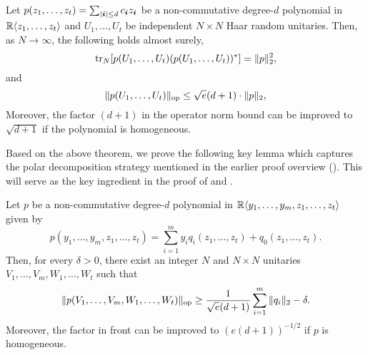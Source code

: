 \begin{theorem} \label{thm:op-norm}
    Let $p(z_1, \ldots, z_t) = \sum_{|{\boldsymbol{i}}|\le d} c_{{\boldsymbol{i}}}z_{{\boldsymbol{i}}} $ be a non-commutative degree-$d$ polynomial in ${\mathbb R}\langle z_1, \ldots, z_t\rangle$ and $U_1, \ldots, U_t$ be independent $N \times N$ Haar random unitaries. Then, as $N \to \infty$, the following holds almost surely, 
    \[ \mathrm{tr}_N[p(U_1, \ldots, U_t) (p(U_1, \ldots, U_t))^*] =  \|p\|_2^2,\]
    and
    \[ \|p(U_1, \ldots, U_t)\|_{\mathrm{op}} \le \sqrt{e}(d+1)  \cdot \|p\|_2,\]
    Moreover, the factor $(d+1)$ in the operator norm bound can be improved to $\sqrt{d+1}$ if the polynomial is homogeneous.
\end{theorem}

Based on the above theorem, we prove the following key lemma which captures the polar decomposition strategy mentioned in the earlier proof overview (). This will serve as the key ingredient in the proof of  and . 

\begin{lemma}\label{lem:polar}
    Let $p$ be a non-commutative degree-$d$ polynomial in ${\mathbb R}\langle y_1, \ldots, y_m, z_1, \ldots, z_t\rangle$ given by
    \[ p(y_1, \ldots, y_m, z_1, \ldots, z_t) = \sum_{i=1}^m y_i q_i(z_1, \ldots, z_t) + q_0(z_1, \ldots, z_t).\]
    Then, for every $\delta > 0$, there exist an integer $N$ and $N \times N$ unitaries $V_1,\ldots, V_m, W_1, \ldots, W_t$ such that 
    \[ \|p(V_1, \ldots, V_m, W_1, \ldots, W_t)\|_{\mathrm{op}} \ge \frac{1}{\sqrt{e}(d+1)} \sum_{i=1}^m \|q_i\|_2 - \delta.\]
    Moreover, the factor in front can be improved to $(e(d+1))^{-1/2}$ if $p$ is homogeneous. 
\end{lemma}

